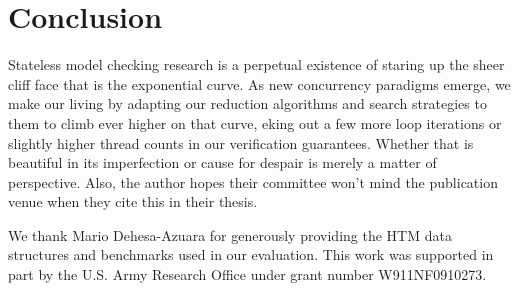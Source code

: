 \documentclass[10pt]{sigplanconf}
\begin{document}

\section{Conclusion}

Stateless model checking research is a perpetual existence of staring up the sheer cliff face that is the exponential curve.
As new concurrency paradigms emerge,
we make our living by adapting our reduction algorithms and search strategies to them to climb ever higher on that curve,
eking out a few more loop iterations or slightly higher thread counts in our verification guarantees.
Whether that is beautiful in its imperfection or cause for despair is merely a matter of perspective.
Also, the author hopes their committee won't mind the publication venue when they cite this in their thesis.


\acks

We thank Mario Dehesa-Azuara for generously providing the HTM data structures and benchmarks used in our evaluation.
This work was supported in part by the U.S. Army Research Office under grant number W911NF0910273.



\end{document}
